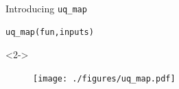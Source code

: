 \documentclass[]{rsuqbeamernew}
\begin{document}
\begin{frame}[fragile]{Introducing \texttt{uq\_map}}

\begin{lstlisting}[basicstyle=\large,numbers=none]
uq_map(fun,inputs)
\end{lstlisting}

\begin{onslide}<2->
  \begin{figure}[htbp]
  \centering
  \texttt{[image: ./figures/uq\_map.pdf]}
\end{figure}
\end{onslide}
  


\end{frame}
\end{document}
